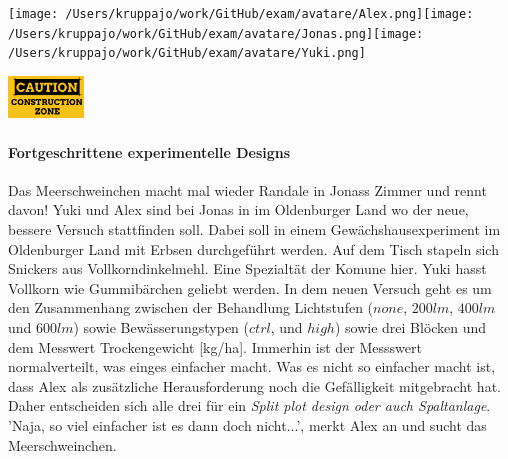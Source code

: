 \documentclass[a4paper, 9pt]{scrartcl}\usepackage[]{graphicx}\usepackage[]{xcolor}
\begin{document}
 
\ifcollection
\begin{flushright}
\tiny\vspace{-3Ex}
\textbf{\examinhaltstart}
\exammodulebiostat
\vspace{-4Ex}
\end{flushright}
\begin{minipage}[t]{0.5\textwidth}
\texttt{[image: /Users/kruppajo/work/GitHub/exam/avatare/Alex.png]}\hspace{-4mm}\texttt{[image: /Users/kruppajo/work/GitHub/exam/avatare/Jonas.png]}\hspace{-4mm}\texttt{[image: /Users/kruppajo/work/GitHub/exam/avatare/Yuki.png]}
\end{minipage}
\begin{minipage}[t]{0.5\textwidth}
\hfill
\href{https://youtu.be/wJqsNV1hOW8}{\includegraphics[width = 2cm]{img/caution}}
\end{minipage}
\fi



\ifcollection
\paragraph{Fortgeschrittene experimentelle Designs}
\fi

Das Meerschweinchen macht mal wieder Randale in Jonass Zimmer und rennt davon! Yuki und Alex sind bei Jonas in im Oldenburger Land wo der neue, bessere Versuch stattfinden soll. Dabei soll in einem Gewächshausexperiment im Oldenburger Land mit Erbsen durchgeführt werden. Auf dem Tisch stapeln sich Snickers aus Vollkorndinkelmehl. Eine Spezialtät der Komune hier. Yuki hasst Vollkorn wie Gummibärchen geliebt werden. In dem neuen Versuch geht es um den Zusammenhang zwischen der Behandlung Lichtstufen ($none$, $200lm$, $400lm$ und $600lm$) sowie Bewässerungstypen ($ctrl$, und $high$) sowie drei Blöcken und dem Messwert Trockengewicht [kg/ha]. Immerhin ist der Messswert normalverteilt, was einges einfacher macht. Was es nicht so einfacher macht ist, dass Alex als zusätzliche Herausforderung noch die Gefälligkeit mitgebracht hat. Daher entscheiden sich alle drei für ein \textit{Split plot design oder auch Spaltanlage}. 'Naja, so viel einfacher ist es dann doch nicht...', merkt Alex an und sucht das Meerschweinchen.\\
\end{document}
